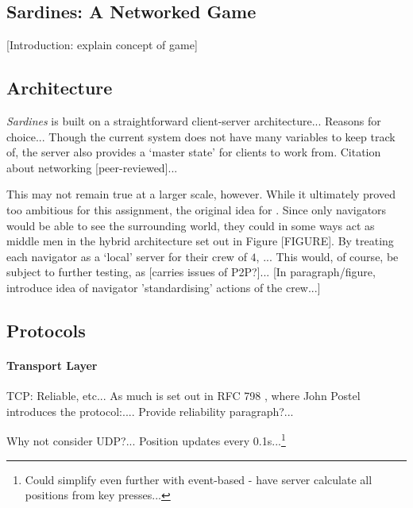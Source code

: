 \documentclass[a4paper, 11pt]{article}
\begin{document}
\graphicspath{{./Images/}}
\begin{flushleft}

\section*{Sardines: A Networked Game}

[Introduction: explain concept of game]

\subsection*{Architecture}

\textit{Sardines} is built on a straightforward client-server architecture... 
Reasons for choice...
Though the current system does not have many variables to keep track of, the server also provides a `master state' for clients to work from.
Citation about networking [peer-reviewed]...

\vspace{5pt}\noindent
This may not remain true at a larger scale, however. While it ultimately proved too ambitious for this assignment, the original idea for . Since only navigators would be able to see the surrounding world, they could in some ways act as middle men in the hybrid architecture set out in Figure [FIGURE]. By treating each navigator as a `local' server for their crew of $4$, ...
This would, of course, be subject to further testing, as [carries issues of P2P?]...
[In paragraph/figure, introduce idea of navigator 'standardising' actions of the crew...]

\vspace{5pt}

\subsection*{Protocols}

\paragraph{Transport Layer}

TCP: Reliable, etc...
As much is set out in RFC 798 %
, where John Postel introduces the protocol:.... %
Provide reliability paragraph?...

\vspace{5pt}\noindent
Why not consider UDP?...
Position updates every 0.1s...\footnote{Could simplify even further with event-based - have server calculate all positions from key presses...}


\end{flushleft}
\end{document}
